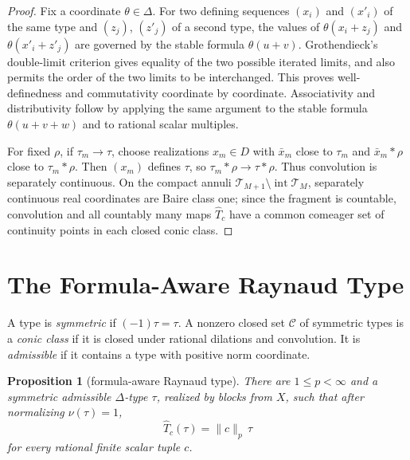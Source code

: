 \documentclass[11pt]{article}
\newtheorem{proposition}{Proposition}
\newcommand{\T}{\mathcal{T}}
\newcommand{\C}{\mathcal{C}}
\begin{document}
\begin{proof}
Fix a coordinate \(\theta\in\Delta\). For two defining sequences
\((x_i)\) and \((x'_i)\) of the same type and \((z_j)\), \((z'_j)\) of a
second type, the values of \(\theta(x_i+z_j)\) and
\(\theta(x'_i+z'_j)\) are governed by the stable formula \(\theta(u+v)\).
Grothendieck's double-limit criterion gives equality of the two possible
iterated limits, and also permits the order of the two limits to be
interchanged. This proves well-definedness and commutativity coordinate by
coordinate. Associativity and distributivity follow by applying the same
argument to the stable formula \(\theta(u+v+w)\) and to rational scalar
multiples.

For fixed \(\rho\), if \(\tau_m\to\tau\), choose realizations \(x_m\in D\)
with \(\bar x_m\) close to \(\tau_m\) and \(\bar x_m*\rho\) close to
\(\tau_m*\rho\). Then \((x_m)\) defines \(\tau\), so
\(\tau_m*\rho\to\tau*\rho\). Thus convolution is separately continuous.
On the compact annuli \(\T_{M+1}\setminus\operatorname{int}\T_M\), separately
continuous real coordinates are Baire class one; since the fragment is
countable, convolution and all countably many maps \(\widehat T_c\) have a
common comeager set of continuity points in each closed conic class.
\end{proof}

\section*{The Formula-Aware Raynaud Type}

A type is \emph{symmetric} if \((-1)\tau=\tau\). A nonzero closed set
\(\C\) of symmetric types is a \emph{conic class} if it is closed under
rational dilations and convolution. It is \emph{admissible} if it contains a
type with positive norm coordinate.

\begin{proposition}[formula-aware Raynaud type]\label{prop:raynaud}
There are \(1\le p<\infty\) and a symmetric admissible
\(\Delta\)-type \(\tau\), realized by blocks from \(X\), such that after
normalizing \(\nu(\tau)=1\),
\[
   \widehat T_c(\tau)=\|c\|_p\,\tau
   \tag{2}
\]
for every rational finite scalar tuple \(c\).
\end{proposition}
\end{document}
